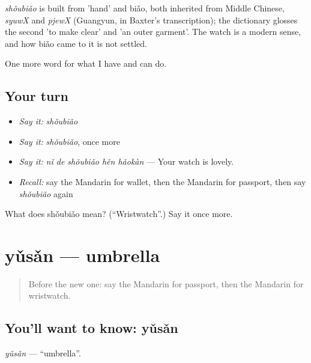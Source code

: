 \begin{cousinweb}
\emph{shǒubiǎo} is built from  'hand' and biǎo, both inherited from Middle Chinese, \emph{syuwX} and \emph{pjewX} (Guangyun, in Baxter's transcription); the dictionary glosses the second 'to make clear' and 'an outer garment'. The watch is a modern sense, and how biǎo came to it is not settled.
\end{cousinweb}

\begin{grammarlens}[title={What you've built}]
One more word for what I have and can do.
\end{grammarlens}

\subsection*{Your turn}
\begin{itemize}
\raggedright
  \item \emph{Say it:} \emph{shǒubiǎo}
  \item \emph{Say it:} \emph{shǒubiǎo}, once more
  \item \emph{Say it:} \emph{nǐ de shǒubiǎo hěn hǎokàn} — Your watch is lovely.
  \item \emph{Recall:} say the Mandarin for wallet, then the Mandarin for passport, then say \emph{shǒubiǎo} again
\end{itemize}

\begin{tcolorbox}[breakable,colback=teal!4,colframe=teal!35!black,title={Before you move on}]
What does shǒubiǎo mean? (\textquotedblleft{}Wristwatch\textquotedblright{}.) Say it once more.
\end{tcolorbox}
\section[yǔsǎn]{yǔsǎn — umbrella}

\label{lesson:ZH-C116-yusan}



\begin{quote}
Before the new one: say the Mandarin for passport, then the Mandarin for wristwatch.
\end{quote}

\subsection*{You'll want to know: yǔsǎn}
\emph{yǔsǎn} — \textquotedblleft{}umbrella\textquotedblright{}.

